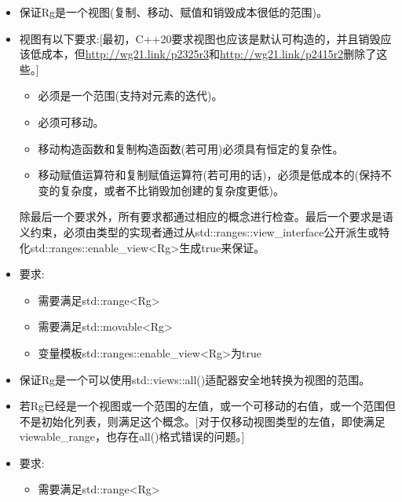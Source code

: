 \begin{itemize}
\item
保证Rg是一个视图(复制、移动、赋值和销毁成本很低的范围)。

\item
视图有以下要求:[最初，C++20要求视图也应该是默认可构造的，并且销毁应该低成本，但\url{http://wg21.link/p2325r3}和\url{http://wg21.link/p2415r2}删除了这些。]

\begin{itemize}
\item
必须是一个范围(支持对元素的迭代)。

\item
必须可移动。

\item
移动构造函数和复制构造函数(若可用)必须具有恒定的复杂性。

\item
移动赋值运算符和复制赋值运算符(若可用的话)，必须是低成本的(保持不变的复杂度，或者不比销毁加创建的复杂度更低)。
\end{itemize}

除最后一个要求外，所有要求都通过相应的概念进行检查。最后一个要求是语义约束，必须由类型的实现者通过从std::ranges::view\_interface公开派生或特化std::ranges::enable\_view<Rg>生成true来保证。

\item
要求:

\begin{itemize}
\item
需要满足std::range<Rg>

\item
需要满足std::movable<Rg>

\item
变量模板std::ranges::enable\_view<Rg>为true
\end{itemize}
\end{itemize}


\begin{itemize}
\item
保证Rg是一个可以使用std::views::all()适配器安全地转换为视图的范围。

\item
若Rg已经是一个视图或一个范围的左值，或一个可移动的右值，或一个范围但不是初始化列表，则满足这个概念。[对于仅移动视图类型的左值，即使满足viewable\_range，也存在all()格式错误的问题。]

\item
要求:

\begin{itemize}
\item
需要满足std::range<Rg>

\end{itemize}
\end{itemize}

